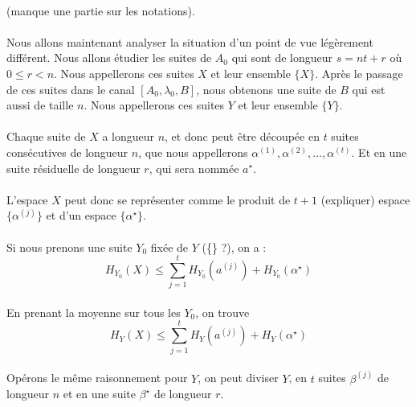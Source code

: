 	\paragraph{}
	(manque une partie sur les notations).
	
	\paragraph{}
	Nous allons maintenant analyser la situation d'un point de vue 
	légèrement différent. Nous allons étudier les suites de $A_0$ qui sont
	de longueur $s = nt+r$ où $0\le r < n$. Nous appellerons ces suites 
	$X$ et leur ensemble $\{X\}$. Après le passage de ces suites dans le 
	canal $[A_0,\lambda_0,B]$, nous obtenons une suite de $B$ qui est aussi
	de taille $n$. Nous appellerons ces suites $Y$ et 
	leur ensemble $\{Y\}$.
	
	\paragraph{}
	Chaque suite de $X$ a longueur $n$, et donc peut être découpée en 
	$t$ suites consécutives de longueur $n$, que nous appellerons 
	$\alpha^{(1)}, \alpha^{(2)}, \dots, \alpha^{(t)}$.
	Et en une suite résiduelle de longueur $r$, qui sera nommée $a^\star$.
	
	\paragraph{}
	L'espace ${X}$ peut donc se représenter comme le produit de $t+1$ 
	(expliquer) espace $\{\alpha^{(j)}\}$ et d'un espace 
	$\{\alpha^\star\}$.
	
	\paragraph{}
	Si nous prenons une suite $Y_0$ fixée de $Y$ (\{\} ?), on a :
	\[
		H_{Y_0}(X)\le 
		\sum_{j=1}^tH_{Y_0}\left(a^{(j)}\right)+H_{Y_0}(\alpha^\star)
	\]
	
	\paragraph{}
	En prenant la moyenne sur tous les $Y_0$, on trouve
	\[H_Y(X)\le \sum_{j=1}^tH_Y\left(a^{(j)}\right)+H_Y(\alpha^\star)\]
	
	\paragraph{}
	Opérons le même raisonnement pour $Y$, on peut diviser $Y$, en $t$ 
	suites $\beta^{(j)}$ de longueur $n$ et en une suite ${\beta^\star}$
	de longueur $r$. 
	
